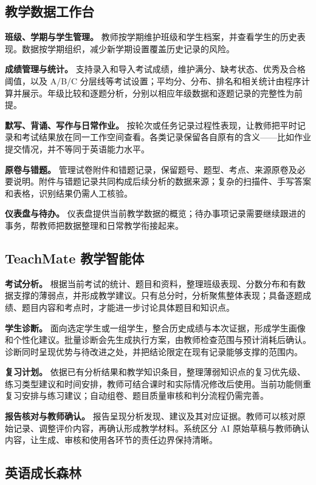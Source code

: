 \documentclass[11pt,a4paper,fontset=none]{ctexart}
\begin{document}
\subsection{教学数据工作台}

\textbf{班级、学期与学生管理。} 教师按学期维护班级和学生档案，并查看学生的历史表现。数据按学期组织，减少新学期设置覆盖历史记录的风险。

\textbf{成绩管理与统计。} 支持录入和导入考试成绩，维护满分、缺考状态、优秀及合格阈值，以及 A/B/C 分层线等考试设置；平均分、分布、排名和相关统计由程序计算并展示。年级比较和逐题分析，分别以相应年级数据和逐题记录的完整性为前提。

\textbf{默写、背诵、写作与日常作业。} 按轮次或任务记录过程性表现，让教师把平时记录和考试结果放在同一工作空间查看。各类记录保留各自原有的含义——比如作业提交情况，并不等同于英语能力水平。

\textbf{原卷与错题。} 管理试卷附件和错题记录，保留题号、题型、考点、来源原卷及必要说明。附件与错题记录共同构成后续分析的数据来源；复杂的扫描件、手写答案和表格，识别结果仍需人工核验。

\textbf{仪表盘与待办。} 仪表盘提供当前教学数据的概览；待办事项记录需要继续跟进的事务，帮教师把数据整理和日常教学衔接起来。

\subsection{TeachMate 教学智能体}

\textbf{考试分析。} 根据当前考试的统计、题目和资料，整理班级表现、分数分布和有数据支撑的薄弱点，并形成教学建议。只有总分时，分析聚焦整体表现；具备逐题成绩、题目内容和考点时，才能进一步讨论具体题目和知识点。

\textbf{学生诊断。} 面向选定学生或一组学生，整合历史成绩与本次证据，形成学生画像和个性化建议。批量诊断会先生成执行方案，由教师检查范围与预计消耗后确认。诊断同时呈现优势与待改进之处，并把结论限定在现有记录能够支撑的范围内。

\textbf{复习计划。} 依据已有分析结果和教学知识条目，整理薄弱知识点的复习优先级、练习类型建议和时间安排，教师可结合课时和实际情况修改后使用。当前功能侧重复习安排与练习建议；自动组卷、题目质量审核和判分流程仍需完善。

\textbf{报告核对与教师确认。} 报告呈现分析发现、建议及其对应证据。教师可以核对原始记录、调整评价内容，再确认形成教学材料。系统区分 AI 原始草稿与教师确认内容，让生成、审核和使用各环节的责任边界保持清晰。

\subsection{英语成长森林}
\end{document}
